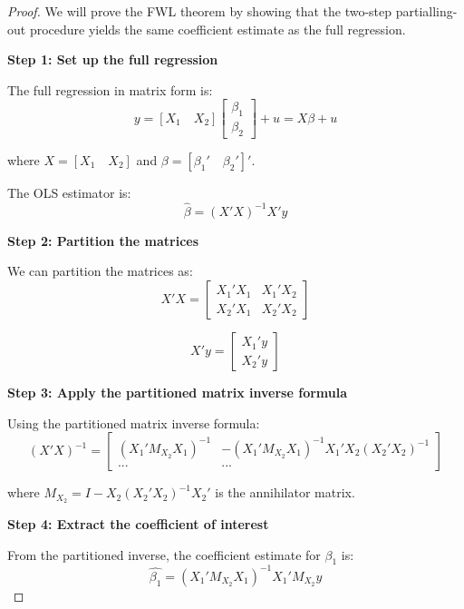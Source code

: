 \documentclass{article}
\newtheorem{proof}{Proof}
\begin{document}
\begin{proof}
We will prove the FWL theorem by showing that the two-step partialling-out procedure yields the same coefficient estimate as the full regression.

\textbf{Step 1: Set up the full regression}

The full regression in matrix form is:
\begin{equation}
y = [X_1 \quad X_2]\begin{bmatrix} \beta_1 \\ \beta_2 \end{bmatrix} + u = X\beta + u
\end{equation}

where $X = [X_1 \quad X_2]$ and $\beta = [\beta_1' \quad \beta_2']'$.

The OLS estimator is:
\begin{equation}
\hat{\beta} = (X'X)^{-1}X'y
\end{equation}

\textbf{Step 2: Partition the matrices}

We can partition the matrices as:
\begin{equation}
X'X = \begin{bmatrix} X_1'X_1 & X_1'X_2 \\ X_2'X_1 & X_2'X_2 \end{bmatrix}
\end{equation}

\begin{equation}
X'y = \begin{bmatrix} X_1'y \\ X_2'y \end{bmatrix}
\end{equation}

\textbf{Step 3: Apply the partitioned matrix inverse formula}

Using the partitioned matrix inverse formula:
\begin{equation}
(X'X)^{-1} = \begin{bmatrix} (X_1'M_{X_2}X_1)^{-1} & -(X_1'M_{X_2}X_1)^{-1}X_1'X_2(X_2'X_2)^{-1} \\ \text{...} & \text{...} \end{bmatrix}
\end{equation}

where $M_{X_2} = I - X_2(X_2'X_2)^{-1}X_2'$ is the annihilator matrix.

\textbf{Step 4: Extract the coefficient of interest}

From the partitioned inverse, the coefficient estimate for $\beta_1$ is:
\begin{equation}
\hat{\beta_1} = (X_1'M_{X_2}X_1)^{-1}X_1'M_{X_2}y
\end{equation}


\end{proof}
\end{document}
